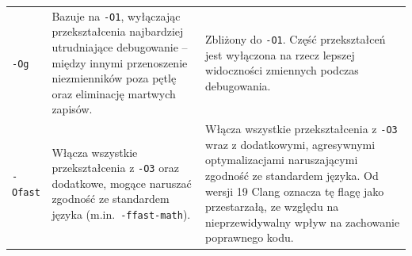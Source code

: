 \begin{table}[htbp]
\begin{tabularx}{\textwidth}{@{} l X X @{}}
        \texttt{-Og} &
            Bazuje na \texttt{-O1}, wyłączając przekształcenia najbardziej utrudniające debugowanie -- między innymi przenoszenie niezmienników poza pętlę oraz eliminację martwych zapisów. &
            Zbliżony do \texttt{-O1}. Część przekształceń jest wyłączona na rzecz lepszej widoczności zmiennych podczas debugowania. \\
        \addlinespace

        \texttt{-Ofast} &
            Włącza wszystkie przekształcenia z \texttt{-O3} oraz dodatkowe, mogące naruszać zgodność ze standardem języka (m.in.\ \texttt{-ffast-math}). &
            Włącza wszystkie przekształcenia z \texttt{-O3} wraz z dodatkowymi, agresywnymi optymalizacjami naruszającymi zgodność ze standardem języka. Od wersji 19 Clang oznacza tę flagę jako przestarzałą, ze względu na nieprzewidywalny wpływ na zachowanie poprawnego kodu. \\

        \bottomrule
    \end{tabularx}
    \vspace{0.5em}
\end{table}

